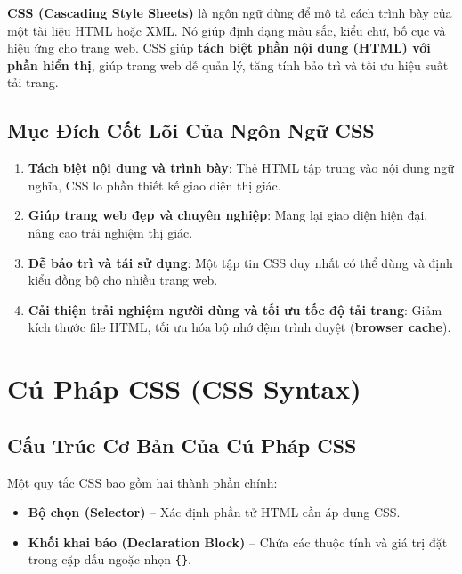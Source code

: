 \documentclass[11pt,oneside]{book}
\newcommand{\codeinline}[1]{\textcolor{accentOrange}{\texttt{#1}}}
\newcommand{\term}[1]{\textbf{\textcolor{primaryBlue}{#1}}}
\begin{document}
\begin{conceptBox}
\textbf{CSS (Cascading Style Sheets)} là ngôn ngữ dùng để mô tả cách trình bày của một tài liệu HTML hoặc XML. Nó giúp định dạng màu sắc, kiểu chữ, bố cục và hiệu ứng cho trang web. CSS giúp \textbf{tách biệt phần nội dung (HTML) với phần hiển thị}, giúp trang web dễ quản lý, tăng tính bảo trì và tối ưu hiệu suất tải trang.
\end{conceptBox}

\subsection{Mục Đích Cốt Lõi Của Ngôn Ngữ CSS}
\begin{enumerate}[leftmargin=1.5em, itemsep=4pt, parsep=0pt]
    \item \textbf{Tách biệt nội dung và trình bày}: Thẻ HTML tập trung vào nội dung ngữ nghĩa, CSS lo phần thiết kế giao diện thị giác.
    \item \textbf{Giúp trang web đẹp và chuyên nghiệp}: Mang lại giao diện hiện đại, nâng cao trải nghiệm thị giác.
    \item \textbf{Dễ bảo trì và tái sử dụng}: Một tập tin CSS duy nhất có thể dùng và định kiểu đồng bộ cho nhiều trang web.
    \item \textbf{Cải thiện trải nghiệm người dùng và tối ưu tốc độ tải trang}: Giảm kích thước file HTML, tối ưu hóa bộ nhớ đệm trình duyệt (\term{browser cache}).
\end{enumerate}

\section{Cú Pháp CSS (CSS Syntax)}

\subsection{Cấu Trúc Cơ Bản Của Cú Pháp CSS}
Một quy tắc CSS bao gồm hai thành phần chính:
\begin{itemize}[leftmargin=1.5em, itemsep=2pt, parsep=0pt]
    \item \textbf{Bộ chọn (Selector)} -- Xác định phần tử HTML cần áp dụng CSS.
    \item \textbf{Khối khai báo (Declaration Block)} -- Chứa các thuộc tính và giá trị đặt trong cặp dấu ngoặc nhọn \codeinline{\{\}}.
\end{itemize}
\end{document}
